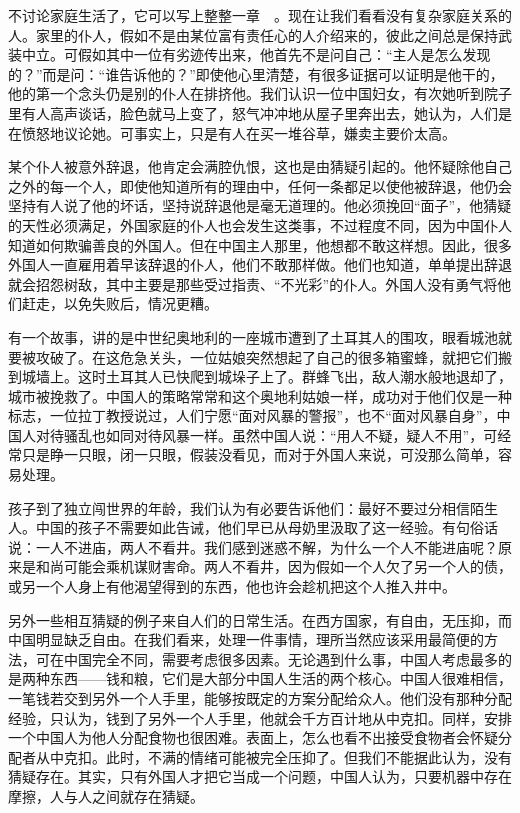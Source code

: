\documentclass[12pt,oneside]{book}
\begin{document}
\begin{common-format}
不讨论家庭生活了，它可以写上整整一章　。现在让我们看看没有复杂家庭关系的人。家里的仆人，假如不是由某位富有责任心的人介绍来的，彼此之间总是保持武装中立。可假如其中一位有劣迹传出来，他首先不是问自己：“主人是怎么发现的？”而是问：“谁告诉他的？”即使他心里清楚，有很多证据可以证明是他干的，他的第一个念头仍是别的仆人在排挤他。我们认识一位中国妇女，有次她听到院子里有人高声谈话，脸色就马上变了，怒气冲冲地从屋子里奔出去，她认为，人们是在愤怒地议论她。可事实上，只是有人在买一堆谷草，嫌卖主要价太高。 

某个仆人被意外辞退，他肯定会满腔仇恨，这也是由猜疑引起的。他怀疑除他自己之外的每一个人，即使他知道所有的理由中，任何一条都足以使他被辞退，他仍会坚持有人说了他的坏话，坚持说辞退他是毫无道理的。他必须挽回“面子”，他猜疑的天性必须满足，外国家庭的仆人也会发生这类事，不过程度不同，因为中国仆人知道如何欺骗善良的外国人。但在中国主人那里，他想都不敢这样想。因此，很多外国人一直雇用着早该辞退的仆人，他们不敢那样做。他们也知道，单单提出辞退就会招怨树敌，其中主要是那些受过指责、“不光彩”的仆人。外国人没有勇气将他们赶走，以免失败后，情况更糟。 

有一个故事，讲的是中世纪奥地利的一座城市遭到了土耳其人的围攻，眼看城池就要被攻破了。在这危急关头，一位姑娘突然想起了自己的很多箱蜜蜂，就把它们搬到城墙上。这时土耳其人已快爬到城垛子上了。群蜂飞出，敌人潮水般地退却了，城市被挽救了。中国人的策略常常和这个奥地利姑娘一样，成功对于他们仅是一种标志，一位拉丁教授说过，人们宁愿“面对风暴的警报”，也不“面对风暴自身”，中国人对待骚乱也如同对待风暴一样。虽然中国人说：“用人不疑，疑人不用”，可经常只是睁一只眼，闭一只眼，假装没看见，而对于外国人来说，可没那么简单，容易处理。 

孩子到了独立闯世界的年龄，我们认为有必要告诉他们：最好不要过分相信陌生人。中国的孩子不需要如此告诫，他们早已从母奶里汲取了这一经验。有句俗话说：一人不进庙，两人不看井。我们感到迷惑不解，为什么一个人不能进庙呢？原来是和尚可能会乘机谋财害命。两人不看井，因为假如一个人欠了另一个人的债，或另一个人身上有他渴望得到的东西，他也许会趁机把这个人推入井中。 

另外一些相互猜疑的例子来自人们的日常生活。在西方国家，有自由，无压抑，而中国明显缺乏自由。在我们看来，处理一件事情，理所当然应该采用最简便的方法，可在中国完全不同，需要考虑很多因素。无论遇到什么事，中国人考虑最多的是两种东西——钱和粮，它们是大部分中国人生活的两个核心。中国人很难相信，一笔钱若交到另外一个人手里，能够按既定的方案分配给众人。他们没有那种分配经验，只认为，钱到了另外一个人手里，他就会千方百计地从中克扣。同样，安排一个中国人为他人分配食物也很困难。表面上，怎么也看不出接受食物者会怀疑分配者从中克扣。此时，不满的情绪可能被完全压抑了。但我们不能据此认为，没有猜疑存在。其实，只有外国人才把它当成一个问题，中国人认为，只要机器中存在摩擦，人与人之间就存在猜疑。 


\end{common-format}
\end{document}
